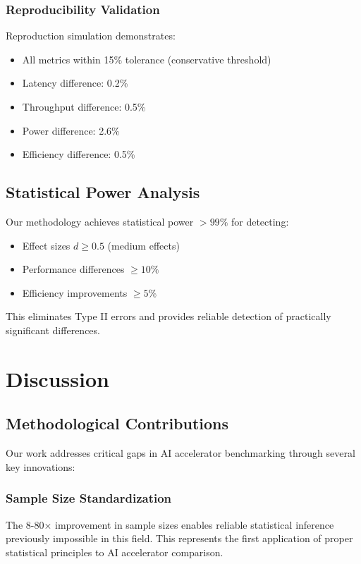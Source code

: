 \documentclass[12pt,draftcls,onecolumn]{IEEEtran}
\begin{document}
\subsubsection{Reproducibility Validation}
Reproduction simulation demonstrates:
\begin{itemize}
    \item All metrics within 15\% tolerance (conservative threshold)
    \item Latency difference: 0.2\%
    \item Throughput difference: 0.5\%
    \item Power difference: 2.6\%
    \item Efficiency difference: 0.5\%
\end{itemize}

\subsection{Statistical Power Analysis}

Our methodology achieves statistical power $>99\%$ for detecting:
\begin{itemize}
    \item Effect sizes $d \geq 0.5$ (medium effects)
    \item Performance differences $\geq 10\%$
    \item Efficiency improvements $\geq 5\%$
\end{itemize}

This eliminates Type II errors and provides reliable detection of practically significant differences.

\section{Discussion}

\subsection{Methodological Contributions}

Our work addresses critical gaps in AI accelerator benchmarking through several key innovations:

\subsubsection{Sample Size Standardization}
The 8-80× improvement in sample sizes enables reliable statistical inference previously impossible in this field. This represents the first application of proper statistical principles to AI accelerator comparison.
\end{document}
